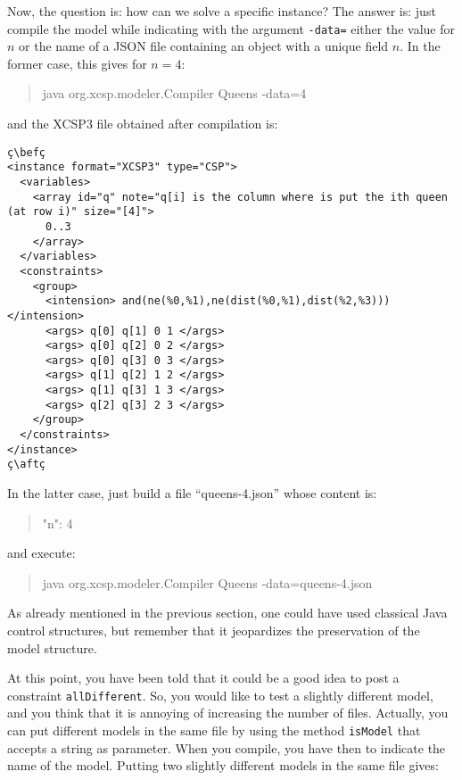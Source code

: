 \documentclass[10pt]{article}
\def\xt{{\rm XCSP3}\xspace}
\newcommand{\gb}[1]{{\tt #1}} %
\newcommand{\nn}[1]{{\tt #1}} %
\def\xt{{\rm XCSP3}\xspace}
\newenvironment{myvb}{\endgraf\small\verbatim}{\endverbatim}
\def\bef{\rule{10cm}{0.1mm}} %
\def\aft{\rule{10cm}{0.1mm}\medskip}
\begin{document}
\bigskip
Now, the question is: how can we solve a specific instance?
The answer is: just compile the model while indicating with the argument \verb!-data=! either the value for $n$ or the name of a JSON file containing an object with a unique field $n$.
In the former case, this gives for $n=4$: 
\begin{quote}
\begin{myvb}
java org.xcsp.modeler.Compiler Queens -data=4
\end{myvb}
\end{quote}
and the \xt file obtained after compilation is:
\begin{lstlisting}
ç\befç
<instance format="XCSP3" type="CSP">
  <variables>
    <array id="q" note="q[i] is the column where is put the ith queen (at row i)" size="[4]">
      0..3
    </array>
  </variables>
  <constraints>
    <group>
      <intension> and(ne(%0,%1),ne(dist(%0,%1),dist(%2,%3))) </intension>
      <args> q[0] q[1] 0 1 </args>
      <args> q[0] q[2] 0 2 </args>
      <args> q[0] q[3] 0 3 </args>
      <args> q[1] q[2] 1 2 </args>
      <args> q[1] q[3] 1 3 </args>
      <args> q[2] q[3] 2 3 </args>
    </group>
  </constraints>
</instance>
ç\aftç
\end{lstlisting}

In the latter case, just build a file ``queens-4.json'' whose content is:
\begin{quote}
\begin{myvb}
{
  "n": 4
}
\end{myvb}
\end{quote}
and execute:
\begin{quote}
\begin{myvb}
java org.xcsp.modeler.Compiler Queens -data=queens-4.json
\end{myvb}
\end{quote}


As already mentioned in the previous section, one could have used classical Java control structures, but remember that it jeopardizes the preservation of the model structure. 

At this point, you have been told that it could be a good idea to post a constraint \gb{allDifferent}.
So, you would like to test a slightly different model, and you think that it is annoying of increasing the number of files.
Actually, you can put different models in the same file by using the method \nn{isModel} that accepts a string as parameter.
When you compile, you have then to indicate the name of the model.
Putting two slightly different models in the same file gives:
\end{document}
